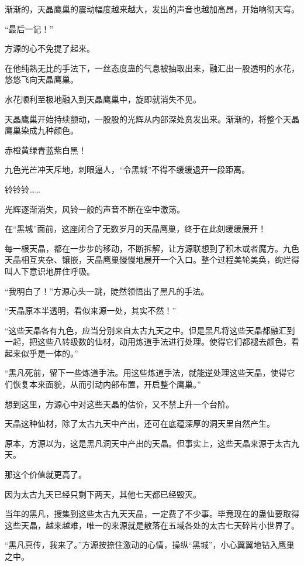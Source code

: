 \begin{this_body}
渐渐的，天晶鹰巢的震动幅度越来越大，发出的声音也越加高昂，开始响彻天穹。

“最后一记！”

方源的心不免提了起来。

在他纯熟无比的手法下，一丝态度蛊的气息被抽取出来，融汇出一股透明的水花，悠悠飞向天晶鹰巢。

水花顺利至极地融入到天晶鹰巢中，旋即就消失不见。

天晶鹰巢开始持续颤动，一股股的光辉从内部深处贲发出来。渐渐的，将整个天晶鹰巢染成九种颜色。

赤橙黄绿青蓝紫白黑！

九色光芒冲天斥地，刺眼逼人，“令黑城”不得不缓缓退开一段距离。

铃铃铃……

光辉逐渐消失，风铃一般的声音不断在空中激荡。

在“黑城”面前，这座闭合了无数岁月的天晶鹰巢，终于在此刻缓缓展开！

每一根天晶，都在一步步的移动，不断拆解，让方源联想到了积木或者魔方。九色天晶相互夹杂、镶嵌，天晶鹰巢慢慢地展开一个入口。整个过程美轮美奂，绚烂得叫人下意识地屏住呼吸。

“我明白了！”方源心头一跳，陡然领悟出了黑凡的手法。

“天晶原本半透明，看似来源一处，其实不然！”

“这些天晶各有九色，应当分别来自太古九天之中。但是黑凡将这些天晶都融汇到一起，把这些八转级数的仙材，动用炼道手法进行处理。使得它们都褪去颜色，看起来似乎是一体的。”

“黑凡死前，留下一些炼道手法。用这些炼道手法，就能逆处理这些天晶，使得它们恢复本来面貌，从而引动内部布置，开启整个鹰巢。”

想到这里，方源心中对这些天晶的估价，又不禁上升一个台阶。

天晶这种仙材，除了太古九天中产出，还可在底蕴深厚的洞天里自然产生。

原本，方源以为，这是黑凡洞天中产出的天晶。但事实上，这些天晶来源于太古九天。

那这个价值就更高了。

因为太古九天已经只剩下两天，其他七天都已经毁灭。

当年的黑凡，搜集到这些太古九天天晶，一定费了不少事。毕竟现在的蛊仙要取得这些天晶，越来越难，唯一的来源就是散落在五域各处的太古七天碎片小世界了。

“黑凡真传，我来了。”方源按捺住激动的心情，操纵“黑城”，小心翼翼地钻入鹰巢之中。

\end{this_body}

